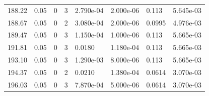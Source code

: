 \documentclass[preview]{standalone}
\begin{document}
{{{{\begin{tabular}{L{1.2cm}C{1.2cm} C{0.3cm}C{0.5cm} C{1.4cm}C{1.4cm} C{1.4cm}C{1.4cm}}
  188.22  &  0.05  & 0     &  3 &  2.790e-04  & 2.000e-06  & 0.113 &  5.645e-03   \\ 
  188.67  &  0.05  & 0     &  2 &  3.080e-04  & 2.000e-06  & 0.0995 &  4.976e-03   \\ 
  189.47  &  0.05  & 0     &  3 &  1.150e-04  & 1.000e-06  & 0.113 &  5.665e-03   \\ 
  191.81  &  0.05  & 0     &  3 &  0.0180  & 1.180e-04  & 0.113 &  5.665e-03   \\ 
  193.10  &  0.05  & 0     &  3 &  1.290e-03  & 8.000e-06  & 0.113 &  5.665e-03   \\ 
  194.37  &  0.05  & 0     &  2 &  0.0210  & 1.380e-04  & 0.0614 &  3.070e-03   \\ 
  196.03  &  0.05  & 0     &  3 &  7.870e-04  & 5.000e-06  & 0.0614 &  3.070e-03   \\ 
\hline 
\end{tabular} 

}}}}
\end{document}

